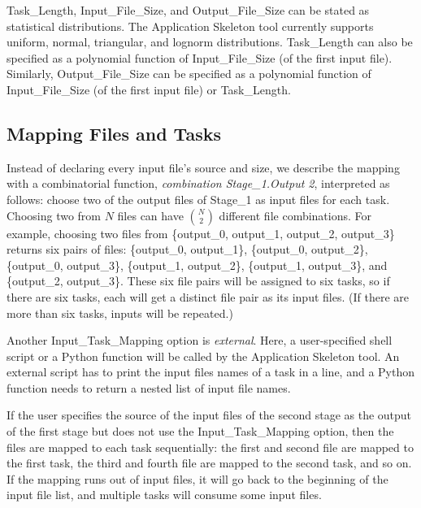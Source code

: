 \documentclass[preprint,12pt]{elsarticle}
\newcommand{\katznote}[1]{ {\textcolor{blue}    { ***Dan:   #1 }}}
\newcommand{\zhaonote}[1]{{\textcolor{cyan}{ ***Zhao:  #1 }}}
\newcommand{\katznote}[1]{}
\newcommand{\zhaonote}[1]{}
\begin{document}
Task\_Length, Input\_File\_Size, and Output\_File\_Size can be stated as statistical distributions. The Application Skeleton tool currently supports uniform, normal, triangular, and lognorm distributions. Task\_Length 
can also be specified as a polynomial function of Input\_File\_Size (of the first input file). Similarly, Output\_File\_Size
can be specified as a polynomial function of Input\_File\_Size (of the first input file) or Task\_Length.


\subsection{Mapping Files and Tasks}

Instead of declaring every input file's source and size, we describe
the mapping with a combinatorial function,
{\it combination Stage\_1.Output 2},
 interpreted as follows: choose two of the output files of Stage\_1 as input files for each task.
Choosing two from $N$ files can have $N \choose 2$ different file combinations. 
For example, choosing two files from \{output\_0, output\_1, output\_2, output\_3\} returns six pairs of files: 
\{output\_0, output\_1\}, \{output\_0, output\_2\}, \{output\_0, output\_3\}, \{output\_1, output\_2\}, \{output\_1, output\_3\}, and \{output\_2, output\_3\}.
These six file pairs will be assigned to six tasks, so if there are six tasks, each will get a distinct file pair as its input files. (If there are more than six tasks, inputs will be repeated.)

Another Input\_Task\_Mapping option is {\it external}. Here, a user-specified
shell script or a Python function will be called by the Application Skeleton tool. An external script
has to print the input files names of a task in a line, and a Python function needs to return a nested
list of input file names.

If the user specifies the source of the input files of the second stage as the output of the first stage
but does not use the Input\_Task\_Mapping option, then the files are mapped to each task sequentially: the first and second file are mapped to the first task, the third and fourth file are mapped
to the second task, and so on. If the mapping runs out of input files, it will go back to the beginning
of the input file list, and multiple tasks will consume some input files.
\end{document}
